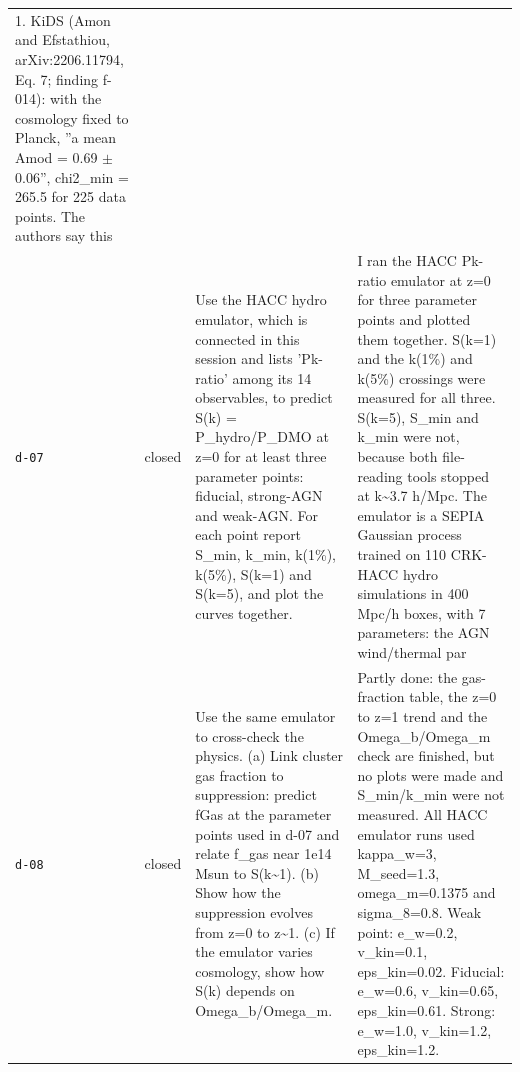 \documentclass[11pt,a4paper]{article}
\begin{document}
\begin{longtable}{@{}p{}p{}p{}p{}@{}}
1. KiDS (Amon and Efstathiou, arXiv:2206.11794, Eq. 7; finding f-014): with the cosmology fixed to Planck, ''a mean Amod = 0.69 $\pm$ 0.06'', chi2\_min = 265.5 for 225 data points. The authors say this  \\
\texttt{d-07} & closed & Use the HACC hydro emulator, which is connected in this session and lists 'Pk-ratio' among its 14 observables, to predict S(k) = P\_hydro/P\_DMO at z=0 for at least three parameter points: fiducial, strong-AGN and weak-AGN. For each point report S\_min, k\_min, k(1\%), k(5\%), S(k=1) and S(k=5), and plot the curves together. & I ran the HACC Pk-ratio emulator at z=0 for three parameter points and plotted them together. S(k=1) and the k(1\%) and k(5\%) crossings were measured for all three. S(k=5), S\_min and k\_min were not, because both file-reading tools stopped at k\textasciitilde{}3.7 h/Mpc. The emulator is a SEPIA Gaussian process trained on 110 CRK-HACC hydro simulations in 400 Mpc/h boxes, with 7 parameters: the AGN wind/thermal par \\
\texttt{d-08} & closed & Use the same emulator to cross-check the physics. (a) Link cluster gas fraction to suppression: predict fGas at the parameter points used in d-07 and relate f\_gas near 1e14 Msun to S(k\textasciitilde{}1). (b) Show how the suppression evolves from z=0 to z\textasciitilde{}1. (c) If the emulator varies cosmology, show how S(k) depends on Omega\_b/Omega\_m. & Partly done: the gas-fraction table, the z=0 to z=1 trend and the Omega\_b/Omega\_m check are finished, but no plots were made and S\_min/k\_min were not measured. All HACC emulator runs used kappa\_w=3, M\_seed=1.3, omega\_m=0.1375 and sigma\_8=0.8. Weak point: e\_w=0.2, v\_kin=0.1, eps\_kin=0.02. Fiducial: e\_w=0.6, v\_kin=0.65, eps\_kin=0.61. Strong: e\_w=1.0, v\_kin=1.2, eps\_kin=1.2.


\end{longtable}
\end{document}
